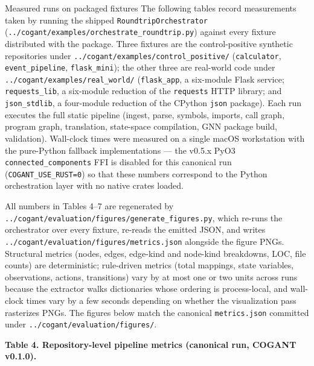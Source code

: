 \documentclass[
  ignorenonframetext,
]{beamer}
\begin{document}
\begin{frame}[fragile]{Measured runs on packaged fixtures}
\protect{}\label{measured-runs-on-packaged-fixtures}
The following tables record measurements taken by running the shipped
\texttt{RoundtripOrchestrator}
(\texttt{../cogant/examples/orchestrate\_roundtrip.py}) against every
fixture distributed with the package. Three fixtures are the
control-positive synthetic repositories under
\texttt{../cogant/examples/control\_positive/} (\texttt{calculator},
\texttt{event\_pipeline}, \texttt{flask\_mini}); the other three are
real-world code under \texttt{../cogant/examples/real\_world/}
(\texttt{flask\_app}, a six-module Flask service;
\texttt{requests\_lib}, a six-module reduction of the \texttt{requests}
HTTP library; and \texttt{json\_stdlib}, a four-module reduction of the
CPython \texttt{json} package). Each run executes the full static
pipeline (ingest, parse, symbols, imports, call graph, program graph,
translation, state-space compilation, GNN package build, validation).
Wall-clock times were measured on a single macOS workstation with the
pure-Python fallback implementations --- the v0.5.x PyO3
\texttt{connected\_components} FFI is disabled for this canonical run
(\texttt{COGANT\_USE\_RUST=0}) so that these numbers correspond to the
Python orchestration layer with no native crates loaded.

All numbers in Tables 4--7 are regenerated by
\texttt{../cogant/evaluation/figures/generate\_figures.py}, which
re-runs the orchestrator over every fixture, re-reads the emitted JSON,
and writes \texttt{../cogant/evaluation/figures/metrics.json} alongside
the figure PNGs. Structural metrics (nodes, edges, edge-kind and
node-kind breakdowns, LOC, file counts) are deterministic; rule-driven
metrics (total mappings, state variables, observations, actions,
transitions) vary by at most one or two units across runs because the
extractor walks dictionaries whose ordering is process-local, and
wall-clock times vary by a few seconds depending on whether the
visualization pass rasterizes PNGs. The figures below match the
canonical \texttt{metrics.json} committed under
\texttt{../cogant/evaluation/figures/}.

\textbf{Table 4. Repository-level pipeline metrics (canonical run,
COGANT v0.1.0).}


\end{frame}
\end{document}
